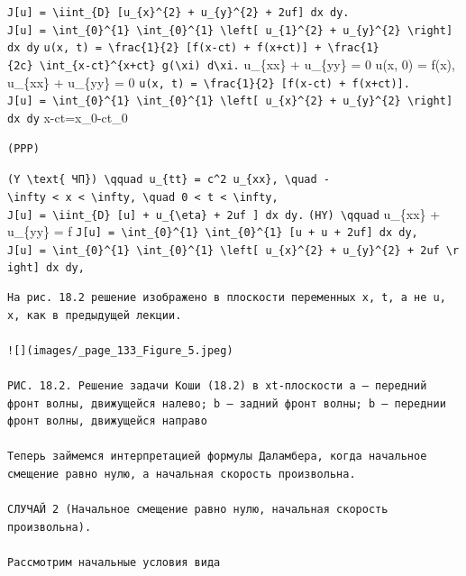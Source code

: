 \documentclass[
  ukrainian,
]{article}
\begin{document}
\texttt{J{[}u{]}\ =\ \textbackslash{}iint\_\{D\}\ {[}u\_\{x\}\^{}\{2\}\ +\ u\_\{y\}\^{}\{2\}\ +\ 2uf{]}\ dx\ dy.}
\texttt{J{[}u{]}\ =\ \textbackslash{}int\_\{0\}\^{}\{1\}\ \textbackslash{}int\_\{0\}\^{}\{1\}\ \textbackslash{}left{[}\ u\_\{1\}\^{}\{2\}\ +\ u\_\{y\}\^{}\{2\}\ \textbackslash{}right{]}\ dx\ dy}
\texttt{u(x,\ t)\ =\ \textbackslash{}frac\{1\}\{2\}\ {[}f(x-ct)\ +\ f(x+ct){]}\ +\ \textbackslash{}frac\{1\}\{2c\}\ \textbackslash{}int\_\{x-ct\}\^{}\{x+ct\}\ g(\textbackslash{}xi)\ d\textbackslash{}xi.}
u\_\{xx\} + u\_\{yy\} = 0 u(x, 0) = f(x), u\_\{xx\} + u\_\{yy\} = 0
\texttt{u(x,\ t)\ =\ \textbackslash{}frac\{1\}\{2\}\ {[}f(x-ct)\ +\ f(x+ct){]}.}
\texttt{J{[}u{]}\ =\ \textbackslash{}int\_\{0\}\^{}\{1\}\ \textbackslash{}int\_\{0\}\^{}\{1\}\ \textbackslash{}left{[}\ u\_\{x\}\^{}\{2\}\ +\ u\_\{y\}\^{}\{2\}\ \textbackslash{}right{]}\ dx\ dy}
x-ct=x\_0-ct\_0

\begin{verbatim}
(PPP)
\end{verbatim}

\texttt{(Y\ \textbackslash{}text\{\ ЧП\})\ \textbackslash{}qquad\ u\_\{tt\}\ =\ c\^{}2\ u\_\{xx\},\ \textbackslash{}quad\ -\textbackslash{}infty\ \textless{}\ x\ \textless{}\ \textbackslash{}infty,\ \textbackslash{}quad\ 0\ \textless{}\ t\ \textless{}\ \textbackslash{}infty,}
\texttt{J{[}u{]}\ =\ \textbackslash{}iint\_\{D\}\ {[}u{]}\ +\ u\_\{\textbackslash{}eta\}\ +\ 2uf\ {]}\ dx\ dy.}
\texttt{(HY)\ \textbackslash{}qquad} u\_\{xx\} + u\_\{yy\} = f
\texttt{J{[}u{]}\ =\ \textbackslash{}int\_\{0\}\^{}\{1\}\ \textbackslash{}int\_\{0\}\^{}\{1\}\ {[}u\textquotesingle{}\ +\ u\textquotesingle{}\ +\ 2uf{]}\ dx\ dy,}
\texttt{J{[}u{]}\ =\ \textbackslash{}int\_\{0\}\^{}\{1\}\ \textbackslash{}int\_\{0\}\^{}\{1\}\ \textbackslash{}left{[}\ u\_\{x\}\^{}\{2\}\ +\ u\_\{y\}\^{}\{2\}\ +\ 2uf\ \textbackslash{}right{]}\ dx\ dy,}

\begin{verbatim}
На рис. 18.2 решение изображено в плоскости переменных x, t, а не u, x, как в предыдущей лекции.

![](images/_page_133_Figure_5.jpeg)

РИС. 18.2. Решение задачи Коши (18.2) в xt-плоскости a — передний фронт волны, движущейся налево; b — задний фронт волны; b — переднии фронт волны, движущейся направо

Теперь займемся интерпретацией формулы Даламбера, когда начальное смещение равно нулю, а начальная скорость произвольна.

СЛУЧАЙ 2 (Начальное смещение равно нулю, начальная скорость произвольна).

Рассмотрим начальные условия вида
\end{verbatim}
\end{document}
